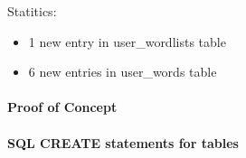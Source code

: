\documentclass[a4paper, 11pt]{article}
\begin{document}
Statitics:
\begin{itemize}
    \item 1 new entry in user\_wordlists table
    \item 6 new entries in user\_words table

\end{itemize}

\clearpage


\paragraph*{Proof of Concept }


\paragraph{SQL CREATE statements for tables}
\end{document}
